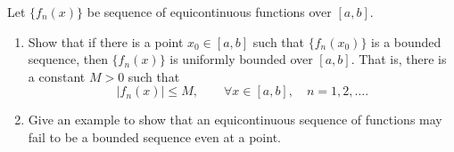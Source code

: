 \begingroup
\renewcommand{\labelenumi}{(\roman{enumi})}
\begin{exercise}
  \label{ex:hw06:equicontinuous-boundedness}
  Let $\{f_n(x)\}$ be sequence of equicontinuous functions over $[a,b]$.
  \begin{enumerate}
    \item Show that if there is a point $x_0\in[a,b]$ such that
      $\{f_n(x_0)\}$ is a bounded sequence, then $\{f_n(x)\}$ is
      uniformly bounded over $[a,b]$. That is, there is a constant $M>0$
      such that
      \[
        |f_n(x)|\le M,\qquad \forall x\in[a,b],\quad n=1,2,\ldots.
      \]
    \item Give an example to show that an equicontinuous sequence of
      functions may fail to be a bounded sequence even at a point.
  \end{enumerate}
\end{exercise}
\endgroup

